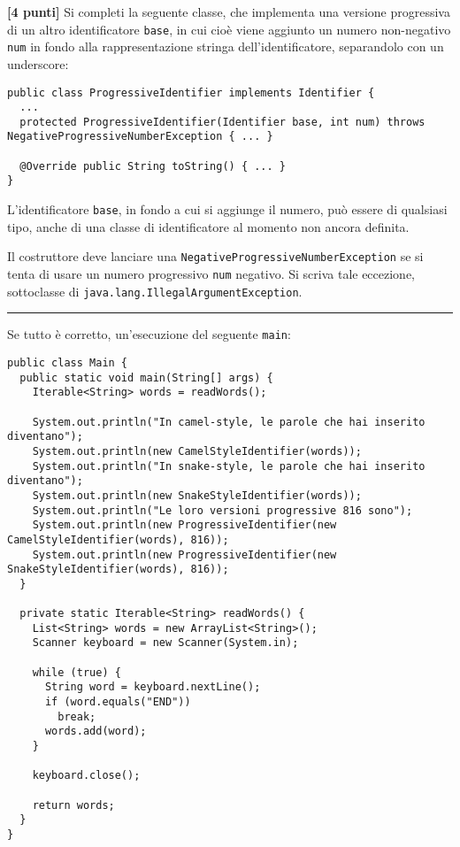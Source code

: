 \documentclass{article}[10pt]
\newcounter{esnu}
\newenvironment{esercizio}{\medskip \noindent {\bf Esercizio\addtocounter{esnu}{1} \arabic{esnu}}}{}
\begin{document}
\begin{esercizio}
\textbf{[4 punti]}
Si completi la seguente classe, che implementa una versione progressiva di un altro identificatore
\texttt{base},
in cui cio\`e viene aggiunto un numero non-negativo \texttt{num}
in fondo alla rappresentazione stringa dell'identificatore,
separandolo con un underscore:
%
{\small
\begin{verbatim}
public class ProgressiveIdentifier implements Identifier {
  ...
  protected ProgressiveIdentifier(Identifier base, int num) throws NegativeProgressiveNumberException { ... }

  @Override public String toString() { ... }
}
\end{verbatim}}

\noindent
L'identificatore \texttt{base}, in fondo a cui si aggiunge il numero, pu\`o essere di qualsiasi
tipo, anche di una classe di identificatore al momento non ancora definita.

Il costruttore deve lanciare una \texttt{NegativeProgressiveNumberException} se si tenta di
usare un numero progressivo \texttt{num} negativo. Si scriva tale eccezione, sottoclasse di
\texttt{java.lang.IllegalArgumentException}.
\end{esercizio}

\vspace*{2ex}
\hrule

\vspace*{2ex}

Se tutto \`e corretto, un'esecuzione del seguente \texttt{main}:
%
{\small
\begin{verbatim}
public class Main {
  public static void main(String[] args) {
    Iterable<String> words = readWords();

    System.out.println("In camel-style, le parole che hai inserito diventano");
    System.out.println(new CamelStyleIdentifier(words));
    System.out.println("In snake-style, le parole che hai inserito diventano");
    System.out.println(new SnakeStyleIdentifier(words));
    System.out.println("Le loro versioni progressive 816 sono");
    System.out.println(new ProgressiveIdentifier(new CamelStyleIdentifier(words), 816));
    System.out.println(new ProgressiveIdentifier(new SnakeStyleIdentifier(words), 816));
  }

  private static Iterable<String> readWords() {
    List<String> words = new ArrayList<String>();
    Scanner keyboard = new Scanner(System.in);

    while (true) {
      String word = keyboard.nextLine();
      if (word.equals("END"))
        break;
      words.add(word);
    }

    keyboard.close();

    return words;
  }
}
\end{verbatim}}
\end{document}
